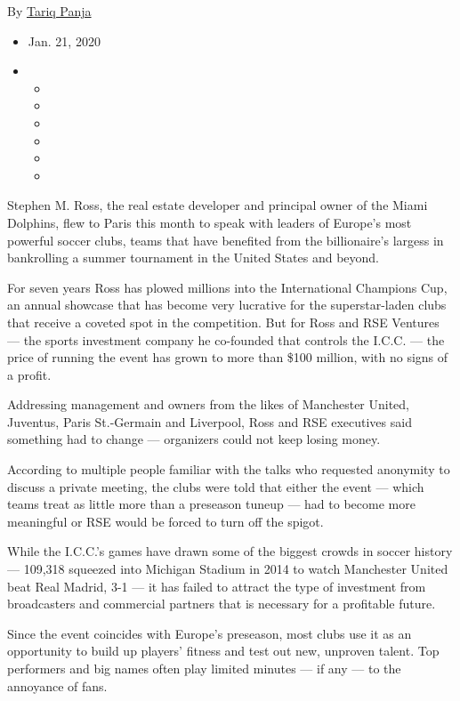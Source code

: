 By \href{https://www.nytimes3xbfgragh.onion/by/tariq-panja}{Tariq Panja}

\begin{itemize}
\item
  Jan. 21, 2020
\item
  \begin{itemize}
  \item
  \item
  \item
  \item
  \item
  \item
  \end{itemize}
\end{itemize}

Stephen M. Ross, the real estate developer and principal owner of the
Miami Dolphins, flew to Paris this month to speak with leaders of
Europe's most powerful soccer clubs, teams that have benefited from the
billionaire's largess in bankrolling a summer tournament in the United
States and beyond.

For seven years Ross has plowed millions into the International
Champions Cup, an annual showcase that has become very lucrative for the
superstar-laden clubs that receive a coveted spot in the competition.
But for Ross and RSE Ventures --- the sports investment company he
co-founded that controls the I.C.C. --- the price of running the event
has grown to more than \$100 million, with no signs of a profit.

Addressing management and owners from the likes of Manchester United,
Juventus, Paris St.-Germain and Liverpool, Ross and RSE executives said
something had to change --- organizers could not keep losing money.

According to multiple people familiar with the talks who requested
anonymity to discuss a private meeting, the clubs were told that either
the event --- which teams treat as little more than a preseason tuneup
--- had to become more meaningful or RSE would be forced to turn off the
spigot.

While the I.C.C.'s games have drawn some of the biggest crowds in soccer
history --- 109,318 squeezed into Michigan Stadium in 2014 to watch
Manchester United beat Real Madrid, 3-1 --- it has failed to attract the
type of investment from broadcasters and commercial partners that is
necessary for a profitable future.

Since the event coincides with Europe's preseason, most clubs use it as
an opportunity to build up players' fitness and test out new, unproven
talent. Top performers and big names often play limited minutes --- if
any --- to the annoyance of fans.

